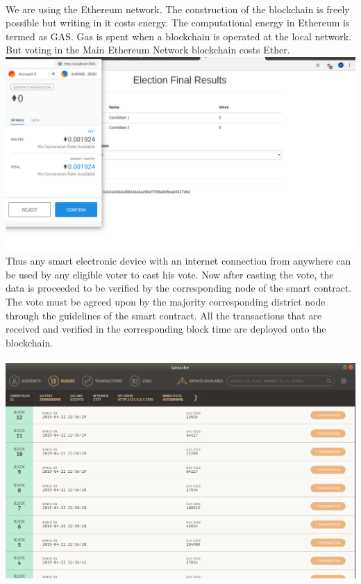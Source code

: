 \documentclass{report}
\begin{document}
 \\
 We are using the Ethereum network. The construction of the blockchain is freely possible but writing in it costs energy. The computational energy in Ethereum is termed as GAS. Gas is spent when a blockchain is operated at the local network. But voting in the Main Ethereum Network blockchain costs Ether. 
 \\
 \includegraphics[scale=0.45]{chrome3.png}
 \\
 Thus any smart electronic device with an internet connection from anywhere can be used by any eligible voter to cast his vote. Now after casting the vote, the data is proceeded to be veriﬁed by the corresponding node of the smart contract. The vote must be agreed upon by the majority corresponding district node through the guidelines of the smart contract. All the transactions that are received and veriﬁed in the corresponding block time are deployed onto the blockchain.\\
 \\
 \includegraphics[scale=0.45]{ganache3.png}
\end{document}
